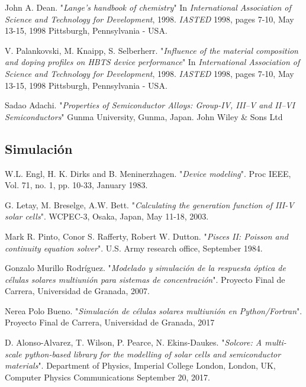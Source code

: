 \begin{thebibliography}{9999999}
	John A. Dean.
	"\textit{Lange's handbook of chemistry}"
	In \textit{International Association of Science and Technology for Development}, 1998.
	\textit{IASTED} 1998, pages 7-10, May 13-15, 1998 Pittsburgh, Pennsylvania - USA.

	V. Palankovski, M. Knaipp, S. Selberherr.
	"\textit{Influence of the material composition and doping profiles on HBTS device performance}"
	In \textit{International Association of Science and Technology for Development}, 1998.
	\textit{IASTED} 1998, pages 7-10, May 13-15, 1998 Pittsburgh, Pennsylvania - USA.

	Sadao Adachi.
	"\textit{Properties of Semiconductor Alloys: Group-IV, III–V and II–VI Semiconductors}"
	Gunma University, Gunma, Japan. John Wiley \& Sons Ltd

\subsection*{\hspace{-4.2em} Simulación}

	W.L. Engl, H. K. Dirks and B. Meninerzhagen.
	"\textit{Device modeling}".
	Proc IEEE, Vol. 71, no. 1, pp. 10-33, January 1983.

	G. Letay, M. Breselge, A.W. Bett.
	"\textit{Calculating the generation function of III-V solar cells}".
	WCPEC-3, Osaka, Japan, May 11-18, 2003.

	Mark R. Pinto, Conor S. Rafferty, Robert W. Dutton.
	"\textit{Pisces II: Poisson and continuity equation solver}".
	U.S. Army research office, September 1984.

	Gonzalo Murillo Rodríguez.
	"\textit{Modelado y simulación de la respuesta óptica de células solares multiunión para sistemas de concentración}".
	Proyecto Final de Carrera, Universidad de Granada, 2007.

	Nerea Polo Bueno.
	"\textit{Simulación de células solares multiunión en Python/Fortran}".
	Proyecto Final de Carrera, Universidad de Granada, 2017

	D. Alonso-Alvarez, T. Wilson, P. Pearce, N. Ekins-Daukes.
	"\textit{Solcore: A multi-scale python-based library for the modelling of solar cells and semiconductor materials}".
	Department of Physics, Imperial College London, London, UK, Computer Physics Communications September 20, 2017.


\end{thebibliography}
